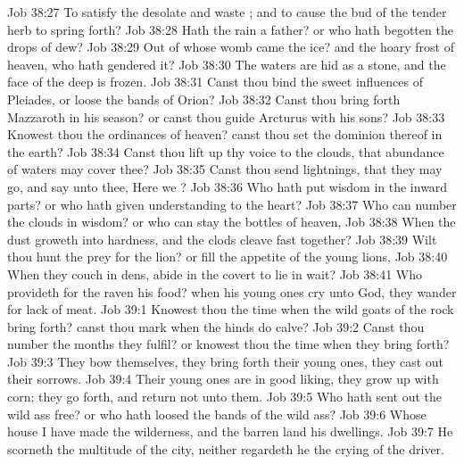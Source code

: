 \vs Job 38:27 To satisfy the desolate and waste ; and to cause the bud of the tender herb to spring forth?
\vs Job 38:28 Hath the rain a father? or who hath begotten the drops of dew?
\vs Job 38:29 Out of whose womb came the ice? and the hoary frost of heaven, who hath gendered it?
\vs Job 38:30 The waters are hid as  a stone, and the face of the deep is frozen.
\vs Job 38:31 Canst thou bind the sweet influences of Pleiades, or loose the bands of Orion?
\vs Job 38:32 Canst thou bring forth Mazzaroth in his season? or canst thou guide Arcturus with his sons?
\vs Job 38:33 Knowest thou the ordinances of heaven? canst thou set the dominion thereof in the earth?
\vs Job 38:34 Canst thou lift up thy voice to the clouds, that abundance of waters may cover thee?
\vs Job 38:35 Canst thou send lightnings, that they may go, and say unto thee, Here we ?
\vs Job 38:36 Who hath put wisdom in the inward parts? or who hath given understanding to the heart?
\vs Job 38:37 Who can number the clouds in wisdom? or who can stay the bottles of heaven,
\vs Job 38:38 When the dust groweth into hardness, and the clods cleave fast together?
\vs Job 38:39 Wilt thou hunt the prey for the lion? or fill the appetite of the young lions,
\vs Job 38:40 When they couch in  dens,  abide in the covert to lie in wait?
\vs Job 38:41 Who provideth for the raven his food? when his young ones cry unto God, they wander for lack of meat.
\vs Job 39:1 Knowest thou the time when the wild goats of the rock bring forth?  canst thou mark when the hinds do calve?
\vs Job 39:2 Canst thou number the months  they fulfil? or knowest thou the time when they bring forth?
\vs Job 39:3 They bow themselves, they bring forth their young ones, they cast out their sorrows.
\vs Job 39:4 Their young ones are in good liking, they grow up with corn; they go forth, and return not unto them.
\vs Job 39:5 Who hath sent out the wild ass free? or who hath loosed the bands of the wild ass?
\vs Job 39:6 Whose house I have made the wilderness, and the barren land his dwellings.
\vs Job 39:7 He scorneth the multitude of the city, neither regardeth he the crying of the driver.
